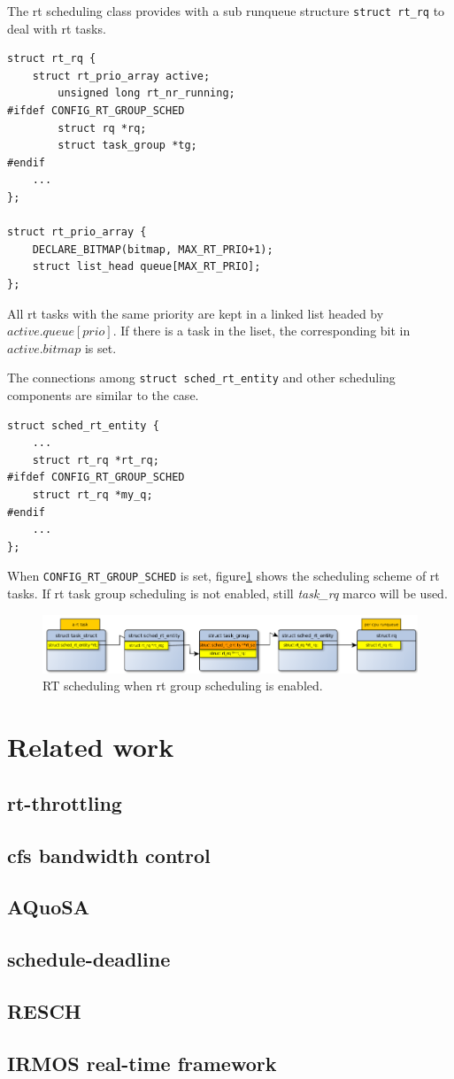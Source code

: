 The rt scheduling class provides with a sub runqueue structure 
\texttt{struct rt\_rq} to deal with rt tasks.
\begin{lstlisting}
struct rt_rq {
	struct rt_prio_array active;
        unsigned long rt_nr_running;
#ifdef CONFIG_RT_GROUP_SCHED
        struct rq *rq;
        struct task_group *tg;
#endif
	...
};

struct rt_prio_array {
	DECLARE_BITMAP(bitmap, MAX_RT_PRIO+1); 
	struct list_head queue[MAX_RT_PRIO];
};
\end{lstlisting}
All rt tasks with the same priority are kept in a linked list headed by
$active.queue[prio]$. If there is a task in the liset, the corresponding 
bit in $active.bitmap$ is set.

The connections among \texttt{struct sched\_rt\_entity} and other scheduling
components are similar to the  case.
\begin{lstlisting}
struct sched_rt_entity {
	...
	struct rt_rq *rt_rq;
#ifdef CONFIG_RT_GROUP_SCHED
	struct rt_rq *my_q;
#endif
	...
}; 
\end{lstlisting}
When \texttt{CONFIG\_RT\_GROUP\_SCHED} is set, figure\ref{fig:rt_scheme_tg} 
shows the scheduling scheme of rt tasks. If rt task group scheduling is 
not enabled, still \emph{task\_rq} marco will be used.
\begin{figure}[htbp]
        \centering
        \includegraphics[width=\textwidth]{images/rt_scheduling_scheme_tg}
        \caption{RT scheduling when rt group scheduling is enabled.}
        \label{fig:rt_scheme_tg}
\end{figure}

\section{Related work}
\subsection{rt-throttling}
\subsection{cfs bandwidth control}
\subsection{AQuoSA}
\subsection{schedule-deadline}
\subsection{RESCH}
\subsection{IRMOS real-time framework}
